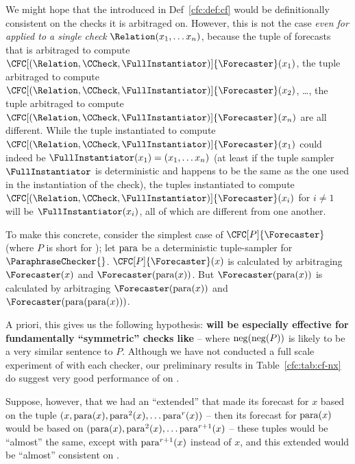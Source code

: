 \NewDocumentCommand{\checktriple}{}{(\Relation,\CCheck,\FullInstantiator)}

We might hope that the \CFCaster{} introduced in Def~\ref{cfc:def:cf} would be definitionally consistent on the checks it is arbitraged on. However, this is not the case \emph{even for }\CFCaster{}\emph{ applied to a single check} $\Relation(x_1,\dots x_n)$,  because the tuple of forecasts that is arbitraged to compute $\CFC[\checktriple]{\Forecaster}(x_1)$, the tuple arbitraged to compute $\CFC[\checktriple]{\Forecaster}(x_2)$, \ldots, the tuple arbitraged to compute $\CFC[\checktriple]{\Forecaster}(x_n)$ are all different. While the tuple instantiated to compute $\CFC[\checktriple]{\Forecaster}(x_1)$ could indeed be $\FullInstantiator(x_1)=(x_1,\dots x_n)$ (at least if the tuple sampler $\FullInstantiator$ is deterministic and happens to be the same as the one used in the instantiation of the check), the tuples instantiated to compute $\CFC[\checktriple]{\Forecaster}(x_i)$ for $i\ne 1$ will be $\FullInstantiator(x_i)$, all of which are different from one another.


To make this concrete, consider the simplest case of $\CFC[P]{\Forecaster}$ (where $P$ is short for \ParaphraseChecker{}); let $\operatorname{para}$ be a deterministic tuple-sampler for $\ParaphraseChecker{}$. $\CFC[P]{\Forecaster}(x)$ is calculated by arbitraging $\Forecaster(x)$ and $\Forecaster(\para(x))$. But $\Forecaster(\para(x))$ is calculated by arbitraging $\Forecaster(\para(x))$ and $\Forecaster(\para(\para(x)))$.

A priori, this gives us the following hypothesis: \textbf{\CFCaster{} will be especially effective for fundamentally ``symmetric'' checks like \NegChecker{}} -- where $\operatorname{neg}(\operatorname{neg}(P))$ is likely to be a very similar sentence to $P$. Although we have not conducted a full scale experiment of \CFCaster{} with each checker, our preliminary results in Table~\ref{cfc:tab:cf-nx} do suggest very good performance of \CFCaster{} on \NegChecker{}.

Suppose, however, that we had an ``extended'' \CFCaster{} that made its forecast for $x$ based on the tuple $(x,\operatorname{para}(x),\operatorname{para}^2(x),\dots \operatorname{para}^r(x))$ -- then its forecast for $\operatorname{para}(x)$ would be based on $(\operatorname{para}(x),\operatorname{para}^2(x),\dots\operatorname{para}^{r+1}(x)$ -- these tuples would be ``almost'' the same, except with $\operatorname{para}^{r+1}(x)$ instead of $x$, and this extended \CFCaster{} would be ``almost'' consistent on \ParaphraseChecker{}.

